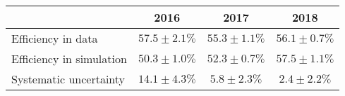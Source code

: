 \begin{table}
\noindent \centering{}
\label{displaced_trk_eff_and_sys}
\begin{tabular}{l|ccc}
\hline
                         & 2016            & 2017            & 2018\\
\hline
Efficiency in data       & $57.5\pm2.1\%$ & $55.3\pm 1.1\%$ & $56.1\pm 0.7\%$  \\
Efficiency in simulation & $50.3\pm 1.0\%$ & $52.3\pm 0.7\%$ & $57.5\pm 1.1\%$ \\
Systematic uncertainty   & $14.1\pm 4.3\%$ & $ 5.8\pm 2.3\%$ & $ 2.4\pm 2.2\%$ \\
\hline
\end{tabular}
\end{table}